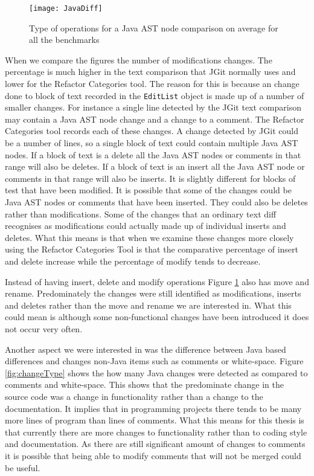 \begin{figure}[!t] 
 \begin{center}
 \texttt{[image: JavaDiff]}
 \end{center}
 \caption{Type of operations for a Java AST node comparison on average for all the benchmarks}
 \label{fig:javaDifference}
\end{figure}

When we compare the figures the number of modifications changes.
The percentage is much higher in the text comparison that JGit normally uses and lower for the Refactor Categories tool.
The reason for this is because an change done to block of text recorded in the \lstinline{EditList} object is made up of a number of smaller changes.  
For instance a single line detected by the JGit text comparison may contain a Java AST node change and a change to a comment.
The Refactor Categories tool records each of these changes.
A change detected by JGit could be a number of lines, so a single block of text could contain multiple Java AST nodes.  
If a block of text is a delete all the Java AST nodes or comments in that range will also be deletes. 
If a block of text is an insert all the Java AST node or comments in that range will also be inserts.
It is slightly different for blocks of test that have been modified.
It is possible that some of the changes could be Java AST nodes or comments that have been inserted.
They could also be deletes rather than modifications.
Some of the changes that an ordinary text diff recognises as modifications could actually made up of individual inserts and deletes.
What this means is that when we examine these changes more closely using the Refactor Categories Tool is that the comparative percentage of insert and delete increase while the percentage of modify tends to decrease.  

Instead of having insert, delete and modify operations Figure \ref{fig:javaDifference} also has move and rename.
Predominately the changes were still identified as modifications, inserts and deletes rather than the move and rename we are interested in.
What this could mean is although some non-functional changes have been introduced it does not occur very often.   

Another aspect we were interested in was the difference between Java based differences and changes non-Java items such as comments or white-space.
Figure \ref{fig:changeType} shows the how many Java changes were detected as compared to comments and white-space.
This shows that the predominate change in the source code was a change in functionality rather than a change to the documentation.
It implies that in programming projects there tends to be many more lines of program than lines of comments.
What this means for this thesis is that currently there are more changes to functionality rather than to coding style and documentation.
As there are still significant amount of changes to comments it is possible that being able to modify comments that will not be merged could be useful.  

